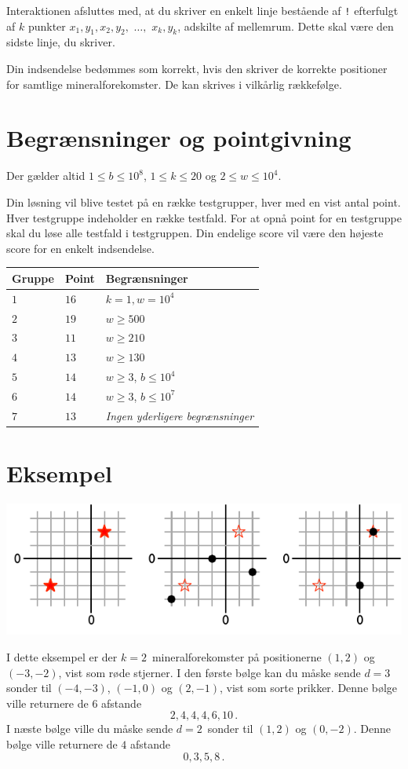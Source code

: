 Interaktionen afsluttes med, at du skriver en enkelt linje bestående af \texttt{!} efterfulgt af $k$ punkter $x_1, y_1, x_2, y_2,$ $\ldots,$ $x_k, y_k$, adskilte af mellemrum.
Dette skal være den sidste linje, du skriver.

Din indsendelse bedømmes som korrekt, hvis den skriver de korrekte positioner for samtlige mineralforekomster.
De kan skrives i vilkårlig rækkefølge.


\section*{Begrænsninger  og pointgivning}

Der gælder altid
$1\leq b \leq 10^8$, %
$1 \leq k \leq 20$ %
og
$2 \le w \leq 10^4$. %

Din løsning vil blive testet på en række testgrupper, hver med en vist antal point.
Hver testgruppe indeholder en række testfald.
For at opnå point for en testgruppe skal du løse alle testfald i testgruppen.
Din endelige score vil være den højeste score for en enkelt indsendelse.

\medskip
\begin{tabular}{lll}
Gruppe & Point & Begrænsninger \\\hline
$1$ & $16$ & $k = 1, w = 10^4$\\
$2$ & $19$ & $w \ge 500$\\
$3$ & $11$ & $w \ge 210$\\
$4$ & $13$ & $w \ge 130$\\
$5$ & $14$ & $w \ge 3$, $b \le 10^4$\\
$6$ & $14$ & $w \ge 3$, $b \le 10^7$\\
$7$ & $13$ & \emph{Ingen yderligere begrænsninger}
\end{tabular}

\section*{Eksempel}

\includegraphics[width=.6\textwidth]{img/sample1.pdf}

I dette eksempel er der $k=2$~mineralforekomster på positionerne $(1,2)$ og $(-3,-2)$, vist som røde stjerner.
I den første bølge kan du måske sende $d=3$ sonder til $(-4,-3)$, $(-1, 0)$ og $(2,-1)$, vist som sorte prikker.
Denne bølge ville returnere de $6$ afstande \[
  2, 4, 4, 4, 6, 10\,.
\]
I næste bølge ville du måske sende $d=2$~sonder til $(1,2)$ og $(0,-2)$.
Denne bølge ville returnere de $4$ afstande
\[
  0, 3, 5, 8\,.
\]
